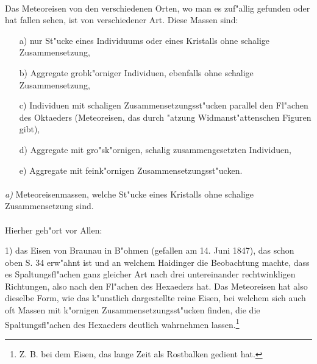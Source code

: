 \documentclass[a4paper, 11pt, oneside]{article}
\begin{document}
\paragraph{}
Das Meteoreisen von den verschiedenen Orten, wo man es zuf"allig gefunden oder hat fallen sehen, ist von verschiedener Art. Diese Massen sind:
\begin{itemize}
  \item[a)] nur St"ucke eines Individuums oder eines Kristalls ohne schalige Zusammensetzung,
  \item[b)] Aggregate grobk"orniger Individuen, ebenfalls ohne schalige Zusammensetzung,
  \item[c)] Individuen mit schaligen Zusammensetzungsst"ucken parallel den Fl"achen des Oktaeders (Meteoreisen, das durch "atzung Widmanst"attenschen Figuren gibt),
  \item[d)] Aggregate mit gro"sk"ornigen, schalig zusammengesetzten Individuen,
  \item[e)] Aggregate mit feink"ornigen Zusammensetzungsst"ucken.
\end{itemize}
\paragraph{}
\emph{a)} Meteoreisenmassen, welche St"ucke eines Kristalls ohne schalige Zusammensetzung sind.
\vspace{\medskipamount}
\paragraph{}
Hierher geh"ort vor Allen:

1) das Eisen von Braunau in B"ohmen (gefallen am 14. Juni 1847), das schon oben S. 34 erw"ahnt ist und an welchem Haidinger die Beobachtung machte, dass es Spaltungsfl"achen ganz gleicher Art nach drei untereinander rechtwinkligen Richtungen, also nach den Fl"achen des Hexaeders hat. Das Meteoreisen hat also dieselbe Form, wie das k"unstlich dargestellte reine Eisen, bei welchem sich auch oft Massen mit k"ornigen Zusammensetzungsst"ucken finden, die die Spaltungsfl"achen des Hexaeders deutlich wahrnehmen lassen.\footnote{Z. B. bei dem Eisen, das lange Zeit als Rostbalken gedient hat.}
\end{document}
